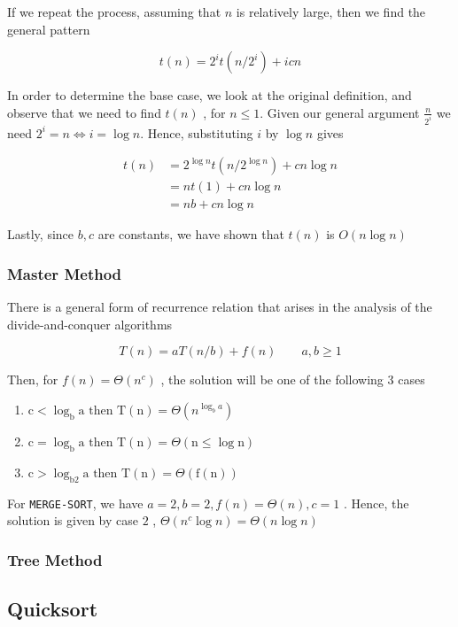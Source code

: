 \par{If we repeat the process, assuming that $n$ is relatively large, then we
find the general pattern}

$$t(n) = 2^it(n/2^i) +  icn$$

\par{In order to determine the base case, we look at the original definition,
and observe that  we need to find $t(n)$ , for $n \leq 1$. Given our general
argument $\frac{n}{2^i}$ we need $2^i = n \iff i = \log n$. Hence, substituting
$i$ by $ \log n$ gives}

\begin{align*}
	t(n) &= 2^{\log n} t(n/2^{\log n}) + cn\log n \\
		&= nt(1) + cn\log n \\
		&= nb + cn\log n
\end{align*}

\par{Lastly, since $b,c$ are constants, we have shown that $t(n)$ is $O(n\log
n)$}

\subsubsection{Master Method}

	\par{There is a general form of recurrence relation that arises in the
analysis of the divide-and-conquer algorithms}

$$T(n) = aT(n/b) + f(n) \qquad a , b \geq 1$$

	\par{Then, for $f(n) = \Theta(n^c)$ , the solution will be one of the
following 3 cases}

	\begin{enumerate}
		\item $
\mathrm{c}<\log _{\mathrm{b}} \mathrm{a} \text { then } \mathrm{T}(\mathrm{n})=\Theta\left(n^{\log _{b} a}\right)
$
		\item $
\mathrm{c}=\log _{\mathrm{b}} \mathrm{a} \text { then } \mathrm{T}(\mathrm{n})=\Theta(\mathrm{n} \leq \log \mathrm{n})
$
		\item $
\mathrm{c}>\log _{\mathrm{b} 2} \mathrm{a} \text { then } \mathrm{T}(\mathrm{n})=\Theta(\mathrm{f}(\mathrm{n}))
$
	\end{enumerate}

\par{For \texttt{MERGE-SORT}, we have $a=2 , b=2 , f(n) = \Theta(n) , c = 1$ .
Hence, the solution is given by case $2$ , $\Theta(n^c \log n) = \Theta(n \log
n)$}

\subsubsection{Tree Method}



\subsection{Quicksort}

